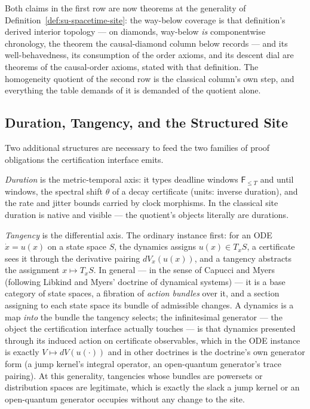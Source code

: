 Both claims in the first row are now theorems at the generality of
Definition~\ref{def:su-spacetime-site}: the way-below coverage is
that definition's derived interior topology --- on diamonds,
way-below \emph{is} componentwise chronology, the theorem the
causal-diamond column below records --- and its well-behavedness,
its consumption of the order axioms, and its descent dial are
theorems of the causal-order axioms, stated with that definition.
The homogeneity
quotient of the second row is the classical column's own step, and
everything the table demands of it is demanded of the quotient
alone.

\subsection{Duration, Tangency, and the Structured Site}

Two additional structures are necessary to feed the two families of
proof obligations the certification interface emits.

\emph{Duration} is the metric-temporal axis: it types deadline windows
$\mathsf{F}_{\le T}$ and until windows, the spectral shift $\theta$ of
a decay certificate (units: inverse duration), and the rate and jitter
bounds carried by clock morphisms. In the classical site duration is
native and visible --- the quotient's objects literally are durations.

\emph{Tangency} is the differential axis. The ordinary instance
first: for an ODE $\dot x = u(x)$ on a state space $S$, the dynamics
assigns $u(x) \in T_x S$, a certificate sees it through the
derivative pairing $dV_x(u(x))$, and a tangency abstracts the
assignment $x \mapsto T_x S$. In general --- in the sense of
Capucci and Myers \cite{capuccimyers2026} (following
Libkind and Myers' doctrine of dynamical systems) --- it is a base
category of state spaces, a fibration of \emph{action bundles} over
it, and a section assigning to each state space its bundle of
admissible changes. A dynamics is a map \emph{into} the bundle the
tangency selects; the infinitesimal generator --- the object the
certification interface actually touches --- is that dynamics
presented through its induced action on certificate observables,
which in the ODE instance is exactly $V \mapsto dV(u(\cdot))$ and in
other doctrines is the doctrine's own generator form (a jump
kernel's integral operator, an open-quantum generator's trace
pairing). At this generality,
tangencies whose bundles are powersets or distribution spaces are
legitimate, which is exactly the slack a jump kernel or an
open-quantum generator occupies without any change to the site.

